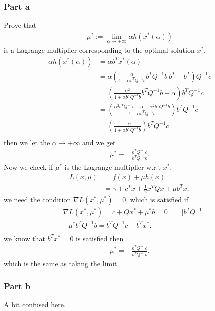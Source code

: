 \subsubsection{Part a}
Prove that
\begin{align}
    \mu^{*} := \lim_{\alpha \to +\infty}\alpha h(x^{*}(\alpha))
\end{align}
is a Lagrange multiplier corresponding to the optimal solution $x^{*}$.
\begin{align}
    \alpha h(x^{*}(\alpha))
    &= \alpha b^{T}x^{*}(\alpha)\\
    &= \alpha \left( \frac{\alpha}{1+\alpha b^{T}Q^{-1}b}b^{T}Q^{-1}b\ b^{T}
    -b^{T}\right) Q^{-1}c\\
    &= \left( \frac{\alpha^{2}}{1+\alpha b^{T}Q^{-1}b}b^{T}Q^{-1}b
     - \alpha\right) b^{T}Q^{-1}c\\
    &= \left( \frac{\alpha^{2} b^{T}Q^{-1}b - \alpha -
    \alpha^{2}b^{T}Q^{-1}b}{1+\alpha b^{T}Q^{-1}b} \right) b^{T}Q^{-1}c\\
    &= \left(\frac{-\alpha}{1+\alpha b^{T}Q^{-1}b} \right) b^{T}Q^{-1}c\\
\end{align}
then we let the $\alpha \to +\infty$ and we get
\begin{align}
    \mu^{*} = -\frac{b^{T}Q^{-1}c}{b^TQ^{-1}b}.
\end{align}
Now we check if $\mu^{*}$ is the Lagrange multiplier w.r.t $x^{*}$.
\begin{align}
    L(x, \mu)
    &= f(x) + \mu h(x)\\
    &= \gamma + c^{T}x + \frac{1}{2}x^{T}Qx + \mu b^{T}x,
\end{align}
we need the condition $\nabla L(x^{*},\mu^{*}) = 0$, which is satisfied if
\begin{align}
    &\nabla L(x^{*}, \mu^{*}) = c + Qx^{*} + \mu^{*}b = 0 \qquad \Big|
    b^{T}Q^{-1}\\
    &-\mu^{*}b^{T}Q^{-1}b = b^{T}Q^{-1}c + b^{T}x^{*}.\\
\end{align}
we know that $b^{T}x^{*}=0$ is satisfied then
\begin{align}
    \mu^{*} = -\frac{b^{T}Q^{-1}c}{b^TQ^{-1}b}.
\end{align}
which is the same as taking the limit.
\subsubsection{Part b}
A bit confused here.
